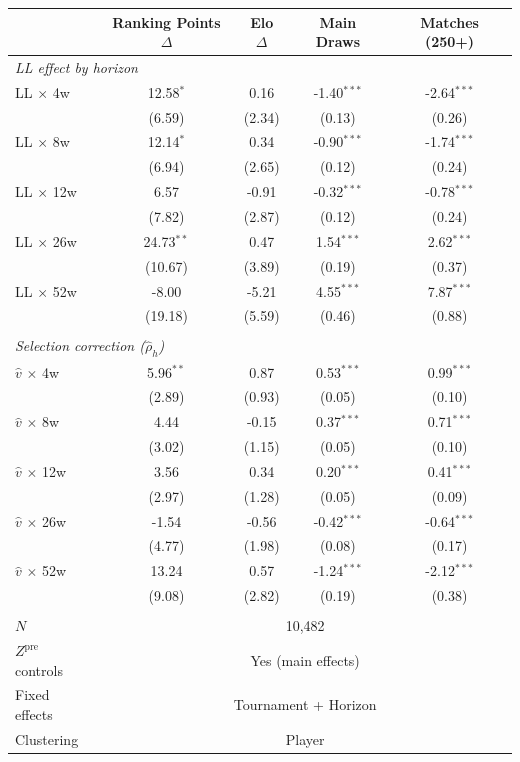 \begin{tabular}{lcccc}
\toprule
 & Ranking Points $\Delta$ & Elo $\Delta$ & Main Draws & Matches (250+) \\
\midrule
\multicolumn{5}{l}{\textit{LL effect by horizon}} \\
\quad LL $\times$ 4w & 12.58$^{*}$ & 0.16 & -1.40$^{***}$ & -2.64$^{***}$ \\
 & (6.59) & (2.34) & (0.13) & (0.26) \\
\quad LL $\times$ 8w & 12.14$^{*}$ & 0.34 & -0.90$^{***}$ & -1.74$^{***}$ \\
 & (6.94) & (2.65) & (0.12) & (0.24) \\
\quad LL $\times$ 12w & 6.57 & -0.91 & -0.32$^{***}$ & -0.78$^{***}$ \\
 & (7.82) & (2.87) & (0.12) & (0.24) \\
\quad LL $\times$ 26w & 24.73$^{**}$ & 0.47 & 1.54$^{***}$ & 2.62$^{***}$ \\
 & (10.67) & (3.89) & (0.19) & (0.37) \\
\quad LL $\times$ 52w & -8.00 & -5.21 & 4.55$^{***}$ & 7.87$^{***}$ \\
 & (19.18) & (5.59) & (0.46) & (0.88) \\
\\[0.3em]
\multicolumn{5}{l}{\textit{Selection correction ($\hat{\rho}_h$)}} \\
\quad $\hat{v}$ $\times$ 4w & 5.96$^{**}$ & 0.87 & 0.53$^{***}$ & 0.99$^{***}$ \\
 & (2.89) & (0.93) & (0.05) & (0.10) \\
\quad $\hat{v}$ $\times$ 8w & 4.44 & -0.15 & 0.37$^{***}$ & 0.71$^{***}$ \\
 & (3.02) & (1.15) & (0.05) & (0.10) \\
\quad $\hat{v}$ $\times$ 12w & 3.56 & 0.34 & 0.20$^{***}$ & 0.41$^{***}$ \\
 & (2.97) & (1.28) & (0.05) & (0.09) \\
\quad $\hat{v}$ $\times$ 26w & -1.54 & -0.56 & -0.42$^{***}$ & -0.64$^{***}$ \\
 & (4.77) & (1.98) & (0.08) & (0.17) \\
\quad $\hat{v}$ $\times$ 52w & 13.24 & 0.57 & -1.24$^{***}$ & -2.12$^{***}$ \\
 & (9.08) & (2.82) & (0.19) & (0.38) \\
\\[0.3em]
\midrule
$N$ & \multicolumn{4}{c}{10,482} \\
$Z^{\text{pre}}$ controls & \multicolumn{4}{c}{Yes (main effects)} \\
Fixed effects & \multicolumn{4}{c}{Tournament + Horizon} \\
Clustering & \multicolumn{4}{c}{Player} \\
\bottomrule
\end{tabular}
